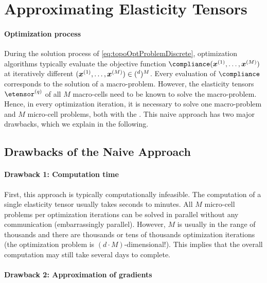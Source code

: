 \section{Approximating Elasticity Tensors}
\label{sec:62tensors}

\paragraph{Optimization process}

During the solution process of \eqref{eq:topoOptProblemDiscrete},
optimization algorithms typically
evaluate the objective function $\compliance(\*x^{(1)}, \dotsc, \*x^{(M)})$
at iteratively different 
$(\*x^{(1)}, \dotsc, \*x^{(M)}) \in (\real^d)^M$.
Every evaluation of $\compliance$ corresponds to the solution of a
macro-problem.
However, the elasticity tensors $\etensor^{(q)}$ of all $M$ macro-cells
need to be known to solve the macro-problem.
Hence, in every optimization iteration, it is necessary to solve
one macro-problem and $M$ micro-cell problems,
both with the \fem.
This naive approach has two major drawbacks, which we explain in
the following.



\subsection{Drawbacks of the Naive Approach}
\label{sec:621drawbacks}

\paragraph{Drawback 1: Computation time}

First, this approach is typically computationally infeasible.
The computation of a single elasticity tensor usually takes seconds to
minutes.
All $M$ micro-cell problems per optimization iterations
can be solved in parallel without any
communication (embarrassingly parallel).
However, $M$ is usually in the range of thousands and
there are thousands or tens of thousands optimization iterations
(the optimization problem is $(d \cdot M)$-dimensional!).
This implies that the overall computation may still take
several days to complete.

\paragraph{Drawback 2: Approximation of gradients}

